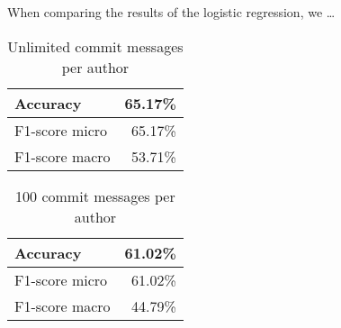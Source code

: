 When comparing the results of the logistic regression, we …

\begin{table}[H]
  \def\arraystretch{1.15}%
  \centering
  \begin{tabular}{|l|r|}
    \hline
    Accuracy       & 65.17\% \\
    \hline
    F1-score micro & 65.17\% \\
    \hline
    F1-score macro & 53.71\% \\
    \hline
  \end{tabular}
  \caption{Unlimited commit messages per author}
  \label{fig:unlimited_commits}
\end{table}

\begin{table}[H]
  \def\arraystretch{1.15}%
  \centering
  \begin{tabular}{|l|r|}
    \hline
    Accuracy       & 61.02\% \\
    \hline
    F1-score micro & 61.02\% \\
    \hline
    F1-score macro & 44.79\% \\
    \hline
  \end{tabular}
  \caption{100 commit messages per author}
  \label{fig:limited_commits}
\end{table}

